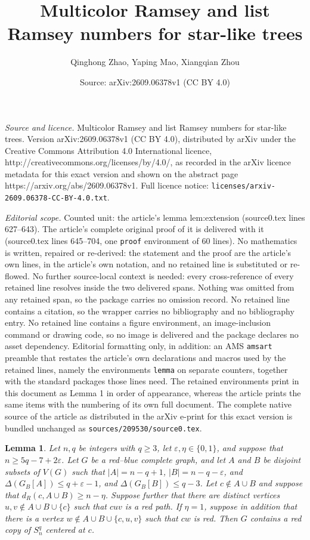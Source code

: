 \documentclass[10pt,a4paper]{amsart}
\title{Multicolor Ramsey and list Ramsey numbers for star-like trees}
\author{Qinghong Zhao, Yaping Mao, Xiangqian Zhou}
\date{Source: arXiv:2609.06378v1 (CC BY 4.0)}
\newtheorem{lemma}{Lemma}
\begin{document}
\maketitle

\noindent\emph{Source and licence.} Multicolor Ramsey and list Ramsey numbers for star-like trees. Version arXiv:2609.06378v1 (CC BY 4.0), distributed by arXiv under the Creative Commons Attribution 4.0 International licence, http://creativecommons.org/licenses/by/4.0/, as recorded in the arXiv licence metadata for this exact version and shown on the abstract page https://arxiv.org/abs/2609.06378v1. Full licence notice: \texttt{licenses/arxiv-2609.06378-CC-BY-4.0.txt}.\par\smallskip

\noindent\textit{Editorial scope.} Counted unit: the article's lemma lem:extension (source0.tex lines 627--643). The article's complete original proof of it is delivered with it (source0.tex lines 645--704, one \texttt{proof} environment of 60 lines). No mathematics is written, repaired or re-derived: the statement and the proof are the article's own lines, in the article's own notation, and no retained line is substituted or re-flowed.  No further source-local context is needed: every cross-reference of every retained line resolves inside the two delivered spans.  Nothing was omitted from any retained span, so the package carries no omission record.  No retained line contains a citation, so the wrapper carries no bibliography and no bibliography entry.  No retained line contains a figure environment, an image-inclusion command or drawing code, so no image is delivered and the package declares no asset dependency.  Editorial formatting only, in addition: an AMS \texttt{amsart} preamble that restates the article's own declarations and macros used by the retained lines, namely the environments \texttt{lemma} on separate counters, together with the standard packages those lines need.  The retained environments print in this document as Lemma 1 in order of appearance, whereas the article prints the same items with the numbering of its own full document.  The complete native source of the article as distributed in the arXiv e-print for this exact version is bundled unchanged as \texttt{sources/209530/source0.tex}.
\begin{lemma}\label{lem:extension}
Let \(n,q\) be integers with \(q\geq3\), let
\(\varepsilon,\eta\in\{0,1\}\), and suppose that
\(n\geq5q-7+2\varepsilon\).
Let \(G\) be a red--blue complete graph, and let \(A\) and \(B\) be
disjoint subsets of \(V(G)\) such that
\(|A|=n-q+1\), \(|B|=n-q-\varepsilon\),
and
\(\Delta(G_B[A])\leq q+\varepsilon-1\), and \(\Delta(G_B[B])\leq q-3\).
Let \(c\notin A\cup B\) and suppose that
\(d_R(c,A\cup B)\geq n-\eta\).
Suppose further that there are distinct vertices
\(u,v\notin A\cup B\cup\{c\}\) such that \(cuv\) is a red path. If
\(\eta=1\), suppose in addition that there is a vertex
\(w\notin A\cup B\cup\{c,u,v\}\) such that \(cw\) is red. Then
\(G\) contains a red copy of \(S_n^q\) centered at \(c\).
\end{lemma}
\end{document}
